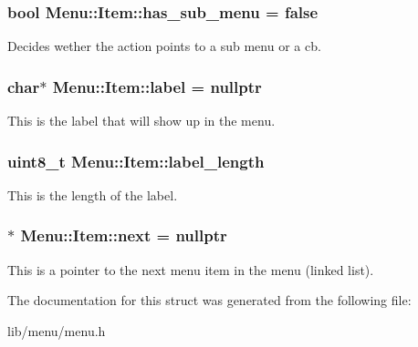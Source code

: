 \subsubsection[{\texorpdfstring{has\+\_\+sub\+\_\+menu}{has_sub_menu}}]{\setlength{\rightskip}{0pt plus 5cm}bool Menu\+::\+Item\+::has\+\_\+sub\+\_\+menu = false}\hypertarget{struct_menu_1_1_item_a5c9895a137458b9a12dafd447ac7430b}{}\label{struct_menu_1_1_item_a5c9895a137458b9a12dafd447ac7430b}
Decides wether the action points to a sub menu or a cb. 
\subsubsection[{\texorpdfstring{label}{label}}]{\setlength{\rightskip}{0pt plus 5cm}char$\ast$ Menu\+::\+Item\+::label = nullptr}\hypertarget{struct_menu_1_1_item_a378723382fc64c752a85ffe6fec9707e}{}\label{struct_menu_1_1_item_a378723382fc64c752a85ffe6fec9707e}
This is the label that will show up in the menu. 
\subsubsection[{\texorpdfstring{label\+\_\+length}{label_length}}]{\setlength{\rightskip}{0pt plus 5cm}uint8\+\_\+t Menu\+::\+Item\+::label\+\_\+length}\hypertarget{struct_menu_1_1_item_a46749d046bbbde8d5308848d5394c2dc}{}\label{struct_menu_1_1_item_a46749d046bbbde8d5308848d5394c2dc}
This is the length of the label. 
\subsubsection[{\texorpdfstring{next}{next}}]{$\ast$ Menu\+::\+Item\+::next = nullptr}\hypertarget{struct_menu_1_1_item_aadcc1e4e824296c6b72ac7d053f06869}{}\label{struct_menu_1_1_item_aadcc1e4e824296c6b72ac7d053f06869}
This is a pointer to the next menu item in the menu (linked list). 

The documentation for this struct was generated from the following file\+:\begin{DoxyCompactItemize}
\item 
lib/menu/menu.\+h\end{DoxyCompactItemize}
